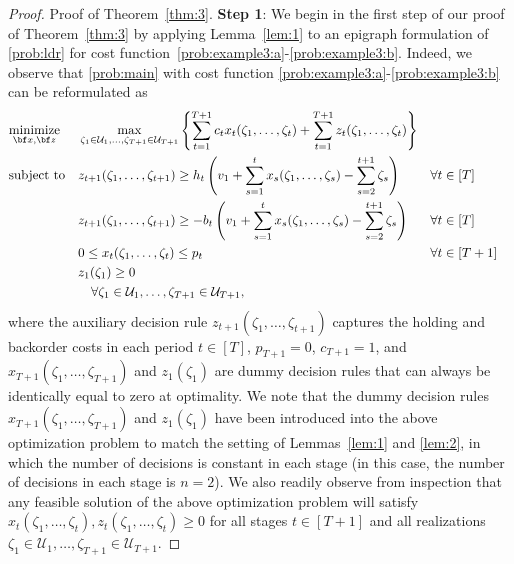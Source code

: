 \documentclass[nonblindrev,mnsc]{informs3} %
\newcommand{\bx}{{\bf x}}
\newcommand{\bz}{{\bf z}}
\begin{document}
\begin{APPENDICES}
\begin{proof}{Proof of Theorem~\ref{thm:3}.}
\vspace{0.5em}
\textbf{Step 1}: We begin in the first step of our proof of Theorem~\ref{thm:3} by applying Lemma~\ref{lem:1} to an epigraph formulation of \eqref{prob:ldr} for cost function~\eqref{prob:example3:a}-\eqref{prob:example3:b}. 
Indeed, we observe that \eqref{prob:main} with cost function \eqref{prob:example3:a}-\eqref{prob:example3:b} can be reformulated as  
\begin{align*}
    \begin{aligned}
&\underset{\bx, \bz}{\textnormal{minimize}}&& \max_{\zeta_1 \in \mathcal{U}_1,\ldots ,\zeta_{T+1} \in \mathcal{U}_{T+1}} \left \{ \sum_{t=1}^{T+1} c_t  x_{t}(\zeta_1,\ldots,\zeta_t) + \sum_{t=1}^{T+1} z_{t}(\zeta_1,\ldots,\zeta_{t}) \right \}  \\
&\textnormal{subject to}&& z_{t+1}(\zeta_1,\ldots,\zeta_{t+1})   \ge h_t \left( v_1 + \sum_{s=1}^t x_{s}(\zeta_1,\ldots,\zeta_s)  - \sum_{s=2}^{t+1} \zeta_s \right)  && \forall t \in [T]\\
&&&z_{t+1}(\zeta_1,\ldots,\zeta_{t+1})   \ge - b_t \left( v_1 + \sum_{s=1}^t x_{s}(\zeta_1,\ldots,\zeta_s)  - \sum_{s=2}^{t+1} \zeta_s \right)  &&  \forall  t \in [T]\\
&&&0 \le x_t(\zeta_1,\ldots,\zeta_t) \le  p_{t} && \forall t\in[T + 1]\\
&&& z_1(\zeta_1) \ge 0 \\
&&& \quad \forall \zeta_1 \in \mathcal{U}_1,\ldots,\zeta_{T+1} \in \mathcal{U}_{T+1},
\end{aligned}
\end{align*}
where the auxiliary decision rule $z_{t+1}(\zeta_1,\ldots,\zeta_{t+1})$ captures the holding and backorder costs in each period $t \in [T]$, $p_{T+1} = 0$, $c_{T+1} = 1$, and  $x_{T+1}(\zeta_1,\ldots,\zeta_{T+1})$ and $z_1(\zeta_1)$ are dummy decision rules that  can always be identically equal to zero at optimality.  
We note that the dummy decision rules $x_{T+1}(\zeta_1,\ldots,\zeta_{T+1})$ and $z_1(\zeta_1)$ have been introduced into the above optimization problem to match the setting of Lemmas~\ref{lem:1} and \ref{lem:2}, in which the number of decisions is constant in each stage (in this case, the number of decisions in each stage is $n = 2$).  We also readily observe from inspection that any feasible solution of the above optimization problem will satisfy  $x_t(\zeta_1,\ldots,\zeta_{t}), z_t(\zeta_1,\ldots,\zeta_t) \ge 0$ for all stages $t \in [T+1]$ and all realizations $\zeta_1 \in \mathcal{U}_1,\ldots,\zeta_{T+1} \in \mathcal{U}_{T+1}$.  


\end{proof}
\end{APPENDICES}
\end{document}
